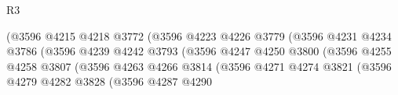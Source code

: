 \begin{lexlean}{R3}
\begin{coremodule}
                                                    (@3596
                                                      @4215
                                                      @4218
                                                      @3772
                                                      (@3596
                                                        @4223
                                                        @4226
                                                        @3779
                                                        (@3596
                                                          @4231
                                                          @4234
                                                          @3786
                                                          (@3596
                                                            @4239
                                                            @4242
                                                            @3793
                                                            (@3596
                                                              @4247
                                                              @4250
                                                              @3800
                                                              (@3596
                                                                @4255
                                                                @4258
                                                                @3807
                                                                (@3596
                                                                  @4263
                                                                  @4266
                                                                  @3814
                                                                  (@3596
                                                                    @4271
                                                                    @4274
                                                                    @3821
                                                                    (@3596
                                                                      @4279
                                                                      @4282
                                                                      @3828
                                                                      (@3596
                                                                        @4287
                                                                        @4290

\end{coremodule}
\end{lexlean}
